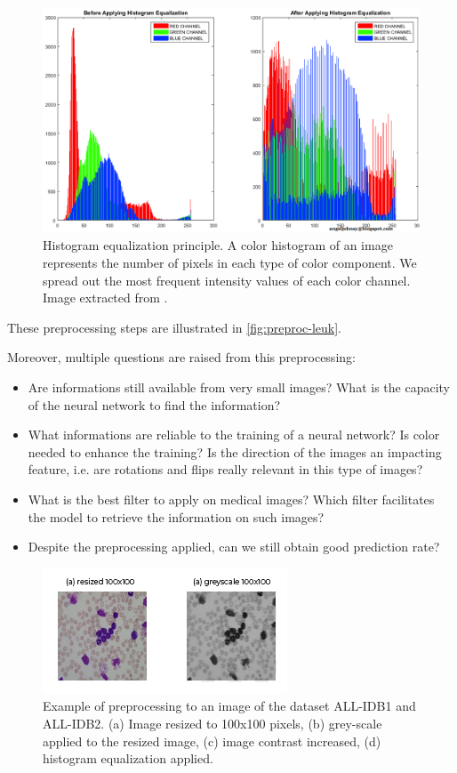 \documentclass[11pt, openany]{report}
\theoremstyle{plain}
\theoremstyle{definition}
\theoremstyle{remark}
\begin{document}
\begin{figure}[H]
  \centering
  \includegraphics[scale=0.3]{figures/color_histogram_plot.png}
  \caption{Histogram equalization principle. A color histogram of an image represents the number of pixels in each type of color component. We spread out the most frequent intensity values of each color channel. Image extracted from \cite{hist-eq-fig}.}
  \label{fig:hist-eq}
\end{figure}

These preprocessing steps are illustrated in \autoref{fig:preproc-leuk}. 

Moreover, multiple questions are raised from this preprocessing: 

\begin{itemize}
\item Are informations still available from very small images? What is the capacity of the neural network to find the information? 
\item What informations are reliable to the training of a neural network? Is color needed to enhance the training? Is the direction of the images an impacting feature, i.e. are rotations and flips really relevant in this type of images?  
\item What is the best filter to apply on medical images? Which filter facilitates the model to retrieve the information on such images? 
\item Despite the preprocessing applied, can we still obtain good prediction rate? 
\end{itemize} 

\begin{figure}[H]
  \centering
  \includegraphics[scale=0.5]{figures/preproc-leuk.PNG}
  \caption{Example of preprocessing to an image of the dataset ALL-IDB1 and ALL-IDB2. (a) Image resized to 100x100 pixels, (b) grey-scale applied to the resized image, (c) image contrast increased, (d) histogram equalization applied.}
  \label{fig:preproc-leuk}
\end{figure}
\end{document}
